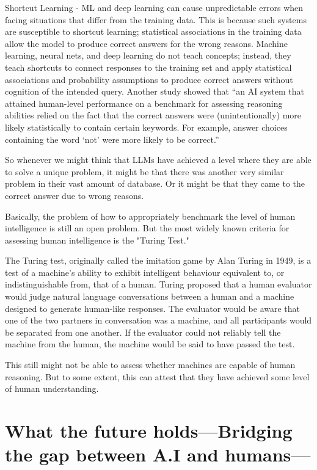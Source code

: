 Shortcut Learning - ML and deep learning can cause unpredictable errors when facing situations that differ from the training data. This is because such systems are susceptible to shortcut learning; statistical associations in the training data allow the model to produce correct answers for the wrong reasons. Machine learning, neural nets, and deep learning do not teach concepts; instead, they teach shortcuts to connect responses to the training set and apply statistical associations and probability assumptions to produce correct answers without cognition of the intended query. Another study showed that “an AI system that attained human-level performance on a benchmark for assessing reasoning abilities relied on the fact that the correct answers were (unintentionally) more likely statistically to contain certain keywords. For example, answer choices containing the word ‘not’ were more likely to be correct.”

So whenever we might think that LLMs have achieved a level where they are able to solve a unique problem, it might be that there was another very similar problem in their vast amount of database. Or it might be that they came to the correct answer due to wrong reasons.

Basically, the problem of how to appropriately benchmark the level of human intelligence is still an open problem. But the most widely known criteria for assessing human intelligence is the "Turing Test."

The Turing test, originally called the imitation game by Alan Turing in 1949, is a test of a machine's ability to exhibit intelligent behaviour equivalent to, or indistinguishable from, that of a human. Turing proposed that a human evaluator would judge natural language conversations between a human and a machine designed to generate human-like responses. The evaluator would be aware that one of the two partners in conversation was a machine, and all participants would be separated from one another. If the evaluator could not reliably tell the machine from the human, the machine would be said to have passed the test.

This still might not be able to assess whether machines are capable of human reasoning. But to some extent, this can attest that they have achieved some level of human understanding.


\section*{What the future holds—Bridging the gap between A.I and humans—}

